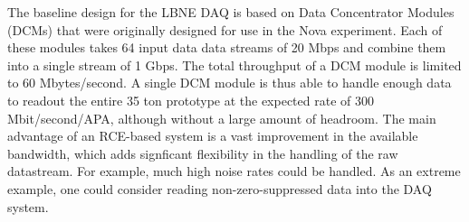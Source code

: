 The baseline design for the LBNE DAQ \cite{DAQ_CD1}
is based on Data Concentrator Modules (DCMs) 
that were originally designed for use in the Nova experiment.
Each of these modules takes 64 input data data streams of 20 Mbps and 
combine them into a single stream of 1 Gbps. 
The total throughput of a DCM module is limited to 60 Mbytes/second.
A single DCM module is thus able to handle enough data to readout the
entire 35 ton prototype at the expected rate of 300 Mbit/second/APA,
although without a large amount of headroom.
The main advantage of an RCE-based system is a vast improvement
in the available bandwidth, which adds signficant flexibility in 
the handling of the raw datastream.
For example, much high noise rates could be handled.
As an extreme example, one could consider reading non-zero-suppressed data 
into the DAQ system.